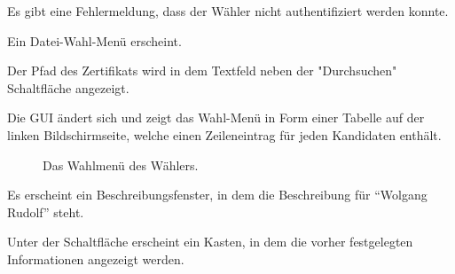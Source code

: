 \documentclass[parskip=full]{scrartcl}
\begin{document}
		{Es gibt eine Fehlermeldung, dass der Wähler nicht authentifiziert werden konnte.}

		{Ein Datei-Wahl-Menü erscheint.}
	
		{Der Pfad des Zertifikats wird in dem Textfeld neben der "Durchsuchen" Schaltfläche angezeigt.}
		
		{Die GUI ändert sich und zeigt das Wahl-Menü in Form einer Tabelle auf der linken Bildschirmseite, welche einen Zeileneintrag für jeden Kandidaten enthält.}
		
\begin{figure}[h!]
	\caption{\label{fig:vot_vote}
		Das Wahlmenü des Wählers.
	}
\end{figure}

		{Es erscheint ein Beschreibungsfenster, in dem die Beschreibung für \enquote{Wolgang Rudolf} steht.}

		{Unter der Schaltfläche erscheint ein Kasten, in dem die vorher festgelegten Informationen angezeigt werden.}
\end{document}
